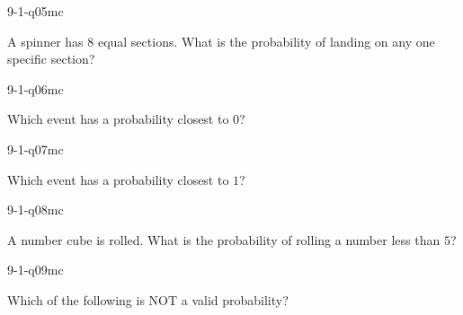\begin{practiceQuestion}{9-1-q05}{mc}
\begin{questionText}
A spinner has $8$ equal sections. What is the probability of landing on any one specific section?
\end{questionText}
\end{practiceQuestion}

\begin{practiceQuestion}{9-1-q06}{mc}
\begin{questionText}
Which event has a probability closest to $0$?
\end{questionText}
\end{practiceQuestion}

\begin{practiceQuestion}{9-1-q07}{mc}
\begin{questionText}
Which event has a probability closest to $1$?
\end{questionText}
\end{practiceQuestion}

\begin{practiceQuestion}{9-1-q08}{mc}
\begin{questionText}
A number cube is rolled. What is the probability of rolling a number less than $5$?
\end{questionText}
\end{practiceQuestion}

\begin{practiceQuestion}{9-1-q09}{mc}
\begin{questionText}
Which of the following is NOT a valid probability?
\end{questionText}
\end{practiceQuestion}

